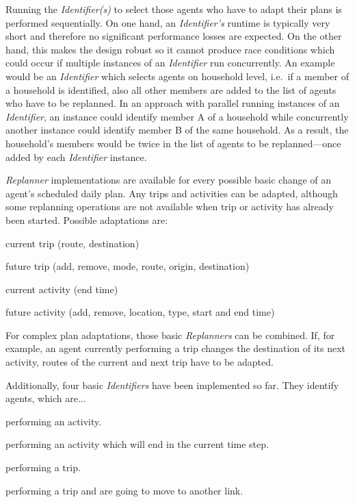 
Running the \emph{Identifier(s)} to select those agents who have to adapt their plans is performed sequentially. On one hand, an \emph{Identifier's} runtime is typically very short and therefore no significant performance losses are expected. On the other hand, 
this makes the design robust so it cannot produce race conditions which could occur if multiple instances of an \emph{Identifier} run concurrently. An example would be an \emph{Identifier} which selects agents on household level, i.e.~if a member of a household is identified, also all other members are added to the list of agents who have to be replanned. In an approach with parallel running instances of an \emph{Identifier}, an instance could identify member A of  a household while concurrently another instance could identify member B of the same household. As a result, the household's members would be twice in the list of agents to be replanned---once added by each \emph{Identifier} instance.


\emph{Replanner} implementations are available for every possible basic change of an agent's scheduled daily plan. Any trips and activities can be adapted, although some replanning operations are not available when trip or activity has already been started. Possible adaptations are:
\begin{compactitem}
    \item current trip (route, destination)
    \item future trip (add, remove, mode, route, origin, destination)
    \item current activity (end time)
    \item future activity (add, remove, location, type, start and end time)
\end{compactitem}
%
For complex plan adaptations, those basic \emph{Replanners} can be combined. If, for example, an agent currently performing a trip changes the destination of its next activity, routes of the current and next trip have to be adapted.


Additionally, four basic \emph{Identifiers} have been implemented so far. They identify agents, which are...
\begin{compactitem}
    \item performing an activity.
    \item performing an activity which will end in the current time step.
    \item performing a trip.
    \item performing a trip and are going to move to another link.
\end{compactitem}

